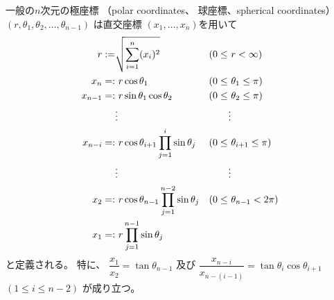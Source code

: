 一般の$n$次元の極座標
（polar coordinates、
球座標、spherical coordinates）
$(r, \theta_1, \theta_2,
\dots, \theta_{n-1})$
は直交座標
$(x_1, \dots, x_n)$を用いて
\begin{subequations}
\begin{align}
    r :=& \sqrt{
        \sum_{i=1}^n
        (x_i)^2
    }
&
    (0 \le\ &r < \infty)
\\
    x_n
    =:&\ 
    r \cos \theta_1
&
    (0 \le\ &\theta_1 \le \pi)
\\
    x_{n-1}
    =:&\ 
    r \sin \theta_1
    \cos \theta_2
&
    (0 \le\ &\theta_2 \le \pi)
\\\notag
    &
    \vdots
    &
    \vdots
\\
    x_{n-i}
    =:&\ 
    r
    \cos \theta_{i+1}
    \prod_{j=1}^{i}
    \sin \theta_j
&
    (0 \le\ &\theta_{i+1} \le \pi)
\\\notag
    &
    \vdots
    &
    \vdots
\\
    x_{2}
    =:&\ 
    r
    \cos \theta_{n-1}
    \prod_{j=1}^{n-2}
    \sin \theta_j
&
    (0 \le\ &\theta_{n-1} < 2 \pi)
\\
    x_{1}
    =:&\ 
    r
    \prod_{j=1}^{n-1}
    \sin \theta_j
\end{align}
\label{n dimensional spherical coordinates}
\end{subequations}
と定義される。
特に、
$\dfrac
    { x_{1} }
    { x_{2} }
=
    \tan \theta_{n-1}
$
及び
$
\dfrac
    { x_{n - i} }
    { x_{n - (i - 1)} }
=
    \tan \theta_{i}
    \cos \theta_{i+1}
$
$(1 \le i \le n - 2)$
が成り立つ。

